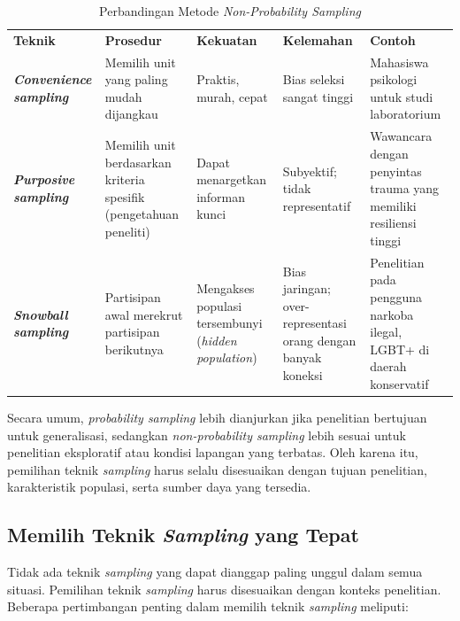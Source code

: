 \documentclass[
  indonesian,
  letterpaper,
  DIV=11,
  numbers=noendperiod]{scrreprt}
\begin{document}
\begin{longtable}[]{@{}
  >{\raggedright\arraybackslash}p{}
  >{\raggedright\arraybackslash}p{}
  >{\raggedright\arraybackslash}p{}
  >{\raggedright\arraybackslash}p{}
  >{\raggedright\arraybackslash}p{}@{}}
\caption{Perbandingan Metode \emph{Non-Probability
Sampling}}\label{tbl-nonprob}\tabularnewline
\toprule\noalign{}
\endfirsthead
\endhead
\bottomrule\noalign{}
\endlastfoot
\textbf{Teknik} & \textbf{Prosedur} & \textbf{Kekuatan} &
\textbf{Kelemahan} & \textbf{Contoh} \\
\textbf{\emph{Convenience sampling}} & Memilih unit yang paling mudah
dijangkau & Praktis, murah, cepat & Bias seleksi sangat tinggi &
Mahasiswa psikologi untuk studi laboratorium \\
\textbf{\emph{Purposive sampling}} & Memilih unit berdasarkan kriteria
spesifik (pengetahuan peneliti) & Dapat menargetkan informan kunci &
Subyektif; tidak representatif & Wawancara dengan penyintas trauma yang
memiliki resiliensi tinggi \\
\textbf{\emph{Snowball sampling}} & Partisipan awal merekrut partisipan
berikutnya & Mengakses populasi tersembunyi (\emph{hidden population}) &
Bias jaringan; over-representasi orang dengan banyak koneksi &
Penelitian pada pengguna narkoba ilegal, LGBT+ di daerah konservatif \\
\end{longtable}

Secara umum, \emph{probability sampling} lebih dianjurkan jika
penelitian bertujuan untuk generalisasi, sedangkan \emph{non-probability
sampling} lebih sesuai untuk penelitian eksploratif atau kondisi
lapangan yang terbatas. Oleh karena itu, pemilihan teknik
\emph{sampling} harus selalu disesuaikan dengan tujuan penelitian,
karakteristik populasi, serta sumber daya yang tersedia.

\subsection{\texorpdfstring{Memilih Teknik \emph{Sampling} yang
Tepat}{Memilih Teknik Sampling yang Tepat}}\label{memilih-teknik-sampling-yang-tepat}

Tidak ada teknik \emph{sampling} yang dapat dianggap paling unggul dalam
semua situasi. Pemilihan teknik \emph{sampling} harus disesuaikan dengan
konteks penelitian. Beberapa pertimbangan penting dalam memilih teknik
\emph{sampling} meliputi:
\end{document}

